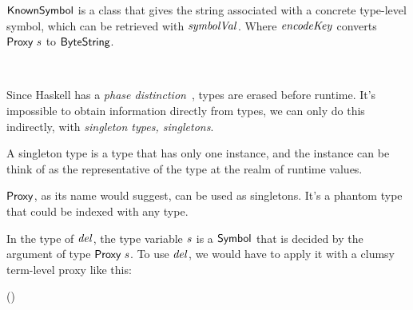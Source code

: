 \ensuremath{\Conid{KnownSymbol}} is a class that gives the string associated
 with a concrete type-level symbol, which can be retrieved with
 \ensuremath{\Varid{symbolVal}}.\footnotemark
 Where \ensuremath{\Varid{encodeKey}} converts \ensuremath{\Conid{Proxy}\;\Varid{s}} to
 \ensuremath{\Conid{ByteString}}.

\begin{hscode}\SaveRestoreHook
{}%
%
\>[B]{}\mathbin{::}\;\Rightarrow {}\;\to {}\<[E]%
\\
\>[B]{}\mathrel{=}\mathbin{\cdot}\<[E]%
\ColumnHook
\end{hscode}\resethooks

Since Haskell has a \emph{phase distinction}~\cite{phasedistinction}, types are
 erased before runtime. It's impossible to obtain information directly from
 types, we can only do this indirectly, with
 \emph{singleton types, singletons}.

A singleton type is a type that has only one instance, and the instance can be
 think of as the representative of the type at the realm of runtime values.

\ensuremath{\Conid{Proxy}}, as its name would suggest, can be used as
 singletons. It's a phantom type that could be indexed with any type.

\begin{hscode}\SaveRestoreHook
{}%
%
\>[B]{}\;\;\mathrel{=}\<[E]%
\ColumnHook
\end{hscode}\resethooks

In the type of \ensuremath{\Varid{del}}, the type variable
 \ensuremath{\Varid{s}} is a \ensuremath{\Conid{Symbol}} that is decided by
 the argument of type \ensuremath{\Conid{Proxy}\;\Varid{s}}.
 To use \ensuremath{\Varid{del}}, we would have to apply it with a clumsy
 term-level proxy like this:

\begin{hscode}\SaveRestoreHook
{}%
%
\>[B]{}\;(\mathbin{::}\;){}\<[E]%
\ColumnHook
\end{hscode}\resethooks
